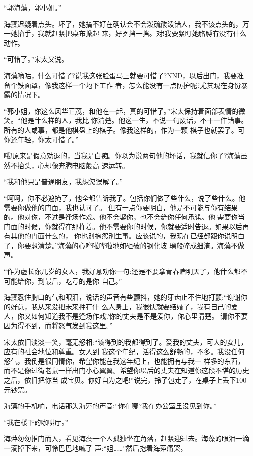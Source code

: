 \documentclass[11pt,a4paper,onecolumn]{article}
\begin{document}
``郭海藻，郭小姐。''

海藻迟疑着点头。坏了，她搞不好在确认会不会泼硫酸泼错人，我不该点头的，万一她抬手，我就赶紧把桌布掀起
来，好歹挡一挡。对!我要紧盯她胳膊有没有什么动作。

``可惜了。''宋太又说。

海藻嘀咕，什么可惜了?说我这张脸蛋马上就要可惜了?NND，以后出门，我要准备个铁面罩，像我这样一个地下工作
者，怎么能没有一点防护呢?尤其现在身份暴露的情况下。

``郭小姐，你这么风华正茂，和他在一起，真的可惜了。''宋太保持着面部表情的微笑。``他是什么样的人，我比
你清楚。他这一生，不说一句废话，不干一件错事。所有的人或事，都是他棋盘上的棋子。像我这样的，作为一颗
棋子也就罢了。可你还年轻，你太可惜了。''

哦!原来是假意劝退的，当我是白痴。你以为说两句他的坏话，我就信你了?海藻虽然不抬头，心却像奔腾电脑般高
速运转。

``我和他只是普通朋友，我想您误解了。''

``呵呵，你不必遮掩了，他全都告诉我了。包括你们做了些什么，说了些什么。他需要你做他的门面，我也认可了。
但有一点你要明白，他是不可能与你有结果的。他对你，不过是逢场作戏。他不会娶你，也不会给你任何承诺。他
需要你当门面的时候，你就得在那杵着。他不需要你的时候，你就要适时告退。如果以后再有其他的门面什么的，
你也别抱怨别生事。应该说的，我现在已经都跟你说明白了，你要想清楚。''海藻的心哗啦哗啦地如砸破的钢化玻
璃般碎成细渣。海藻不做声。

``作为虚长你几岁的女人，我好意劝你一句:还是不要拿青春赌明天了，他什么都不可能给你，到最后，吃亏的是你
自己。''

海藻忍住胸口的气和眼泪，说话的声音有些颤抖，她的牙齿止不住地打颤:``谢谢你的好意，我从来没把未来押在什
么人身上，我很快就要结婚了，我有自己的爱人，你又如何知道我不是逢场作戏?你的丈夫是不是爱你，你心里清楚。
请你不要因为得不到，而将怒气发到我这里。''

宋太依旧淡淡一笑，毫无怒相:``该得到的我都得到了。爱我的丈夫，可人的女儿，应有的社会地位和尊重。女人到
我这个年纪，活得这么舒畅的，不多。我没任何怒气，我倒是很同情你，希望你能在我这年纪上，也能拥有与我一
样多的东西，而不是像过街老鼠一样出门小心翼翼。希望你以后的丈夫在知道你这段不堪的历史之后，依旧把你当
成宝贝。你好自为之吧!''说完，拎了包走了，在桌子上丢下100元钞票。

海藻的手机响，电话那头海萍的声音:``你在哪?我在办公室里没见到你。''

``我在楼下的咖啡厅。''

海萍匆匆推门而入，看见海藻一个人孤独坐在角落，赶紧迎过去。海藻的眼泪一滴一滴掉下来，可怜巴巴地喊了
声:``姐……''然后抱着海萍痛哭。
\end{document}
